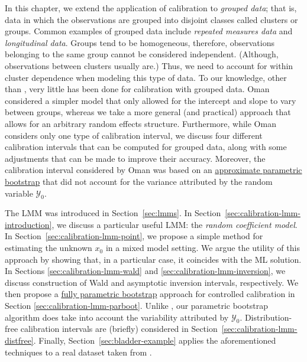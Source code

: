 \documentclass[cmfont,usenames,dvipsnames,leqno]{afit-etd}\usepackage[]{graphicx}\usepackage[]{color}
\newcommand{\mc}[1]{\ensuremath{\mathcal{#1}}}
\begin{document}
In this chapter, we extend the application of calibration to \textit{grouped data}; that is, data in which the observations are grouped into disjoint classes called clusters or groups. Common examples of grouped data include \textit{repeated measures data} and \textit{longitudinal data}. Groups tend to be homogeneous, therefore, observations belonging to the same group cannot be considered independent. (Although, observations between clusters usually are.) Thus, we need to account for within cluster dependence when modeling this type of data. To our knowledge, other than \citet{oman_calibration_1998}, very little has been done for calibration with grouped data. Oman considered a simpler model that only allowed for the intercept and slope to vary between groups, whereas we take a more general (and practical) approach that allows for an arbitrary random effects structure. Furthermore, while Oman considers only one type of calibration interval, we discuss four different calibration intervals that can be computed for grouped data, along with some adjustments that can be made to improve their accuracy. Moreover, the calibration interval considered by Oman was based on an \underline{approximate parametric bootstrap} that did not account for the variance attributed by the random variable $\mc{Y}_0$.

The \ac{LMM} was introduced in Section~\ref{sec:lmms}. In Section~\ref{sec:calibration-lmm-introduction}, we discuss a particular useful LMM: the \textit{random coefficient model}. In Section~\ref{sec:calibration-lmm-point}, we propose a simple method for estimating the unknown $x_0$ in a mixed model setting. We argue the utility of this approach by showing that, in a particular case, it coincides with the \ac{ML} solution. In Sections \ref{sec:calibration-lmm-wald} and \ref{sec:calibration-lmm-inversion}, we discuss construction of Wald and asymptotic inversion intervals, respectively. We then propose a \underline{fully parametric bootstrap} approach for controlled calibration in Section \ref{sec:calibration-lmm-parboot}. Unlike \citet{oman_calibration_1998}, our parametric bootstrap algorithm does take into account the variability attributed by $\mc{Y}_0$. Distribution-free calibration intervals are (briefly) considered in Section~\ref{sec:calibration-lmm-distfree}. Finally, Section~\ref{sec:bladder-example} applies the aforementioned techniques to a real dataset taken from \citet{brown_measurement_1993}.
\end{document}

